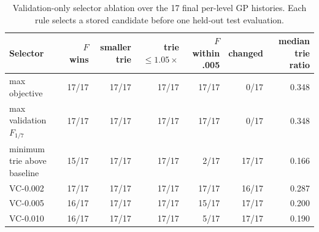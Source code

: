 \begin{table}[tb]
\centering\small
\caption{Validation-only selector ablation over the 17 final per-level GP histories. Each rule selects a stored candidate before one held-out test evaluation.}
\label{tab:final-selector-ablation}
\begin{tabular}{l r r r r r r}
\toprule
Selector & $F$ wins & smaller trie & trie $\leq 1.05\times$ & $F$ within .005 & changed & median trie ratio \\
\midrule
max objective & 17/17 & 17/17 & 17/17 & 17/17 & 0/17 & 0.348 \\
max validation $F_{1/7}$ & 17/17 & 17/17 & 17/17 & 17/17 & 0/17 & 0.348 \\
minimum trie above baseline & 15/17 & 17/17 & 17/17 & 2/17 & 17/17 & 0.166 \\
VC-0.002 & 17/17 & 17/17 & 17/17 & 17/17 & 16/17 & 0.287 \\
VC-0.005 & 16/17 & 17/17 & 17/17 & 15/17 & 17/17 & 0.200 \\
VC-0.010 & 16/17 & 17/17 & 17/17 & 5/17 & 17/17 & 0.190 \\
\bottomrule
\end{tabular}
\end{table}
